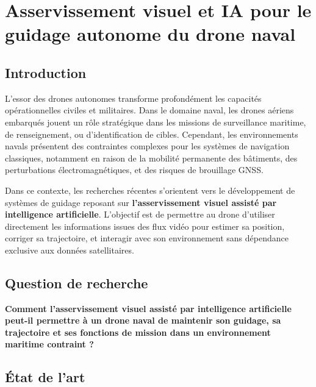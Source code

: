 \documentclass[12pt, a4paper, twoside, openright]{report}
\begin{document}
\cleardoublepage
\chapter{Asservissement visuel et IA pour le guidage autonome du drone naval}\label{chap:axe2}

\section{Introduction}
L’essor des drones autonomes transforme profondément les capacités opérationnelles civiles et militaires. Dans le domaine naval, les drones aériens embarqués jouent un rôle stratégique dans les missions de surveillance maritime, de renseignement, ou d’identification de cibles. Cependant, les environnements navals présentent des contraintes complexes pour les systèmes de navigation classiques, notamment en raison de la mobilité permanente des bâtiments, des perturbations électromagnétiques, et des risques de brouillage GNSS.

Dans ce contexte, les recherches récentes s’orientent vers le développement de systèmes de guidage reposant sur \textbf{l’asservissement visuel assisté par intelligence artificielle}. L’objectif est de permettre au drone d’utiliser directement les informations issues des flux vidéo pour estimer sa position, corriger sa trajectoire, et interagir avec son environnement sans dépendance exclusive aux données satellitaires.

\section{Question de recherche}
\begin{framed}
    \textbf{Comment l’asservissement visuel assisté par intelligence artificielle peut-il permettre à un drone naval de maintenir son guidage, sa trajectoire et ses fonctions de mission dans un environnement maritime contraint ?}
\end{framed}

\section{État de l’art}
\end{document}
